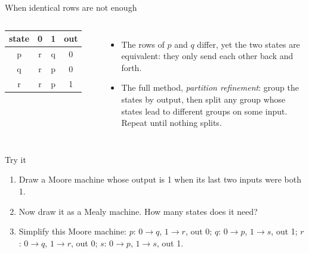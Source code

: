 \documentclass[10pt]{wosm-slides}
\newcommand*\srow[4]{#1 & #2 & #3 & #4 \\}
\begin{document}
\begin{frame}{When identical rows are not enough}
  \begin{columns}[c, totalwidth=\textwidth]
      \centering
      \small
      \begin{tabular}{@{}c|cc|c@{}}
        state & 0 & 1 & out \\
        \midrule
        \srow{p}{r}{\alert{q}}{0}
        \srow{q}{r}{\alert{p}}{0}
        \srow{r}{r}{p}{1}
      \end{tabular}
      \begin{itemize}
        \item The rows of $p$ and $q$ differ, yet the two states are equivalent: they
          only send each other back and forth.
        \item The full method, \emph{partition refinement}: group the states by
          output, then split any group whose states lead to different groups on
          some input. Repeat until nothing splits.
      \end{itemize}
  \end{columns}

  \bigskip
\end{frame}

\begin{frame}{Try it}
  \begin{enumerate}
    \item Draw a Moore machine whose output is 1 when its last two inputs were both
      1.\par
    \item Now draw it as a Mealy machine. How many states does it need?\par
    \item Simplify this Moore machine: $p$: $0 \to q$, $1 \to r$, out 0; $q$:
      $0 \to p$, $1 \to s$, out 1; $r$: $0 \to q$, $1 \to r$, out 0; $s$: $0 \to p$,
      $1 \to s$, out 1.\par
  \end{enumerate}
\end{frame}
\end{document}
